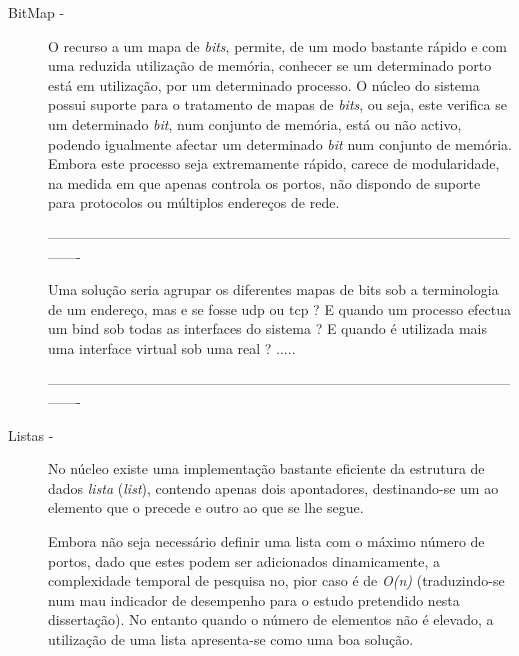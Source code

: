 \begin{description}

\item[BitMap - ]

O recurso a um mapa de \textit{bits}, permite, de um modo bastante rápido e com uma reduzida utilização de memória, conhecer se um determinado porto está em utilização, por um determinado processo.
O núcleo do sistema possui suporte para o tratamento de mapas de \textit{bits}, ou seja, este verifica se um determinado \textit{bit}, num conjunto de memória, está ou não activo, podendo igualmente afectar um determinado \textit{bit} num conjunto de memória.
Embora este processo seja extremamente rápido, carece de modularidade, na medida em que apenas controla os portos, não dispondo de suporte para protocolos ou múltiplos endereços de rede.
 
----------------------------------------------------------------------------------------------------------

Uma solução seria agrupar os diferentes mapas de bits sob a terminologia de um endereço, mas e se fosse udp ou tcp ?
E quando um processo efectua um bind sob todas as interfaces do sistema ? 
E quando é utilizada mais uma interface virtual sob uma real ? .....

----------------------------------------------------------------------------------------------------------

\item[Listas - ]

No núcleo existe uma implementação bastante eficiente da estrutura de dados \emph{lista} (\emph{list}), contendo apenas dois apontadores, destinando-se um ao elemento que o precede e outro ao que se lhe segue.

Embora não seja necessário definir uma lista com o máximo número de portos, dado que estes podem ser adicionados dinamicamente, a complexidade temporal de pesquisa no, pior caso é de \textit{O(n)} (traduzindo-se num mau indicador de desempenho para o estudo pretendido nesta dissertação).
No entanto quando o número de elementos não é elevado, a utilização de uma lista apresenta-se como uma boa solução.



\end{description}
